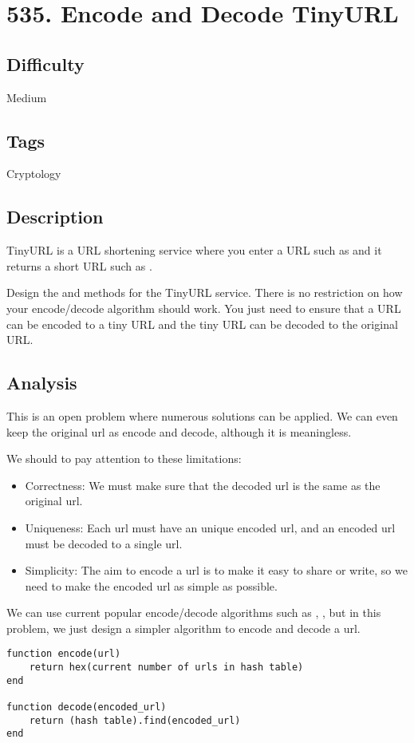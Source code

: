 \tocless\section{535. Encode and Decode TinyURL}
\label{algo:535}

\subsection*{Difficulty}
Medium

\subsection*{Tags}
Cryptology

\subsection*{Description}
TinyURL is a URL shortening service where you enter a URL such as  and it returns a short URL such as .

Design the  and  methods for the TinyURL service. There is no restriction on how your encode/decode algorithm should work. You just need to ensure that a URL can be encoded to a tiny URL and the tiny URL can be decoded to the original URL.

\subsection*{Analysis}
This is an open problem where numerous solutions can be applied. We can even keep the original url as encode and decode, although it is meaningless.

We should to pay attention to these limitations:
\begin{itemize}
	\item Correctness: We must make sure that the decoded url is the same as the original url.
	\item Uniqueness: Each url must have an unique encoded url, and an encoded url must be decoded to a single url.
	\item Simplicity: The aim to encode a url is to make it easy to share or write, so we need to make the encoded url as simple as possible.
\end{itemize}

We can use current popular encode/decode algorithms such as , , but in this problem, we just design a simpler algorithm to encode and decode a url.
\begin{verbatim}
function encode(url)
    return hex(current number of urls in hash table)
end

function decode(encoded_url)
    return (hash table).find(encoded_url)
end
\end{verbatim}

